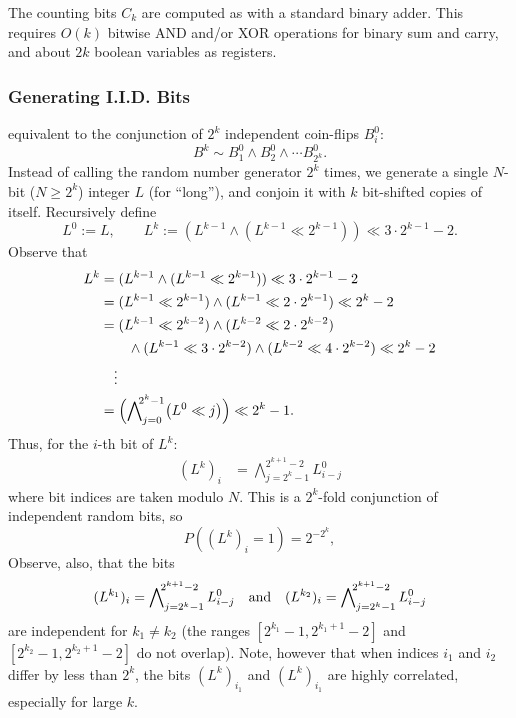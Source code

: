 The counting bits $C_k$ are computed as with a standard binary adder.  
This requires $O(k)$ bitwise AND and/or XOR operations for binary sum and carry,
and about $2k$ boolean variables as registers.

\subsubsection{Generating I.I.D. Bits}

equivalent to the conjunction of $2^k$ independent coin-flips $B_i^0$:
$$B^k \sim B^0_1 \wedge B^0_2 \wedge \cdots B^0_{2^k}.$$
Instead of calling the random number generator $2^k$ times,
we generate a single $N$-bit ($N\geq2^k$) integer $L$ (for ``long''), and 
conjoin it with $k$ bit-shifted copies of itself.  Recursively define
\begin{equation}
L^0 := L, \qquad L^k := (L^{k-1} \wedge (L^{k-1} \ll 2^{k-1})) \ll 3\cdot 2^{k-1}-2.
\end{equation}
Observe that
\begin{align*}
L^k &= (L^{k-1} \wedge (L^{k-1} \ll 2^{k-1})) \ll 3\cdot 2^{k-1}-2 \\
&= (L^{k-1} \ll 2^{k-1}) \wedge (L^{k-1} \ll 2\cdot 2^{k-1}) \ll 2^k-2 \\
&= (L^{k-1} \ll 2^{k-2}) \wedge (L^{k-2} \ll 2\cdot 2^{k-2})\\
&\qquad\wedge (L^{k-1} \ll 3\cdot2^{k-2}) \wedge (L^{k-2} \ll 4\cdot 2^{k-2})  \ll 2^k-2\\ 
&\quad\vdots\\
&= \Bigl(\bigwedge\nolimits_{j=0}^{\!\!2^k-1} \bigl(L^0 \ll j\bigr)\Bigr) \ll 2^k-1.
\end{align*}
Thus, for the $i$-th bit of $L^k$:
\def\ww{\,\wedge\,}
\begin{align*}
(L^k)_i %
&= \bigwedge\nolimits_{j=2^k-1}^{\!\!2^{k+1}-2} L^0_{i-j}
\end{align*}
where bit indices are taken modulo $N$.  
This is a $2^k$-fold conjunction of independent random bits, so 
$$P((L^k)_i=1) = 2^{-2^k},$$
Observe, also, that the bits 
$$(L^{k_1})_i = \bigwedge\nolimits_{j=2^k-1}^{\!\!2^{k+1}-2} L^0_{i-j} \quad\text{and}\quad
(L^{k_2})_i = \bigwedge\nolimits_{j=2^k-1}^{\!\!2^{k+1}-2} L^0_{i-j}$$
are independent for $k_1\neq k_2$ (the ranges $[2^{k_1}-1, 2^{k_1+1}-2]$
and $[2^{k_2}-1, 2^{k_2+1}-2]$ do not overlap).
Note, however that when indices $i_1$ and $i_2$ differ by less than $2^k$,
the bits $(L^k)_{i_1}$ and $(L^k)_{i_1}$ are highly correlated, especially for large $k$.

